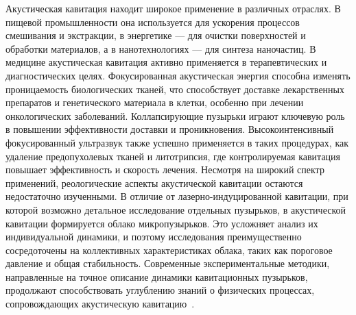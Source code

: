 Акустическая кавитация находит широкое применение в различных отраслях. 
В пищевой промышленности она используется для ускорения процессов смешивания и экстракции, в энергетике — для очистки поверхностей и обработки материалов, а в нанотехнологиях — для синтеза наночастиц. 
В медицине акустическая кавитация активно применяется в терапевтических и диагностических целях. Фокусированная акустическая энергия способна изменять проницаемость биологических тканей, что способствует доставке лекарственных препаратов и генетического материала в клетки, особенно при лечении онкологических заболеваний. 
Коллапсирующие пузырьки играют ключевую роль в повышении эффективности доставки и проникновения.
Высокоинтенсивный фокусированный ультразвук также успешно применяется в таких процедурах, как удаление предопухолевых тканей и литотрипсия, где контролируемая кавитация повышает эффективность и скорость лечения.
Несмотря на широкий спектр применений, реологические аспекты акустической кавитации остаются недостаточно изученными. 
В отличие от лазерно-индуцированной кавитации, при которой возможно детальное исследование отдельных пузырьков, в акустической кавитации формируется облако микропузырьков. 
Это усложняет анализ их индивидуальной динамики, и поэтому исследования преимущественно сосредоточены на коллективных характеристиках облака, таких как пороговое давление и общая стабильность. 
Современные экспериментальные методики, направленные на точное описание динамики кавитационных пузырьков, продолжают способствовать углублению знаний о физических процессах, сопровождающих акустическую кавитацию~\cite{10.1007/978-3-319-68237-2_1, 10.1016/b978-0-12-801530-8.00003-7, 10.1081/asr-200030202, 10.1016/j.ultsonch.2010.11.016}.

